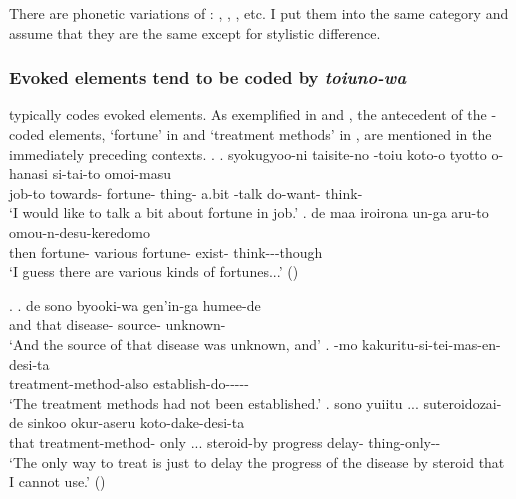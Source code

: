 There are phonetic variations of :
, , , etc.
I put them into the same category  and assume that they are the same
except for stylistic difference.


\subsubsection{Evoked elements tend to be coded by \textit{toiuno-wa}}

 typically codes evoked elements.
As exemplified in \Next and \NNext,
the antecedent of the -coded elements,
 `fortune' in \Next and  `treatment methods' in \NNext,
are mentioned in the immediately preceding contexts.
%
\ex.
 \ag. syokugyoo-ni taisite-no -toiu koto-o tyotto o-hanasi si-tai-to omoi-masu \\
		job-to towards- fortune- thing- a.bit -talk do-want- think- \\
		`I would like to talk a bit about fortune in job.'
 \bg. de  maa iroirona un-ga aru-to omou-n-desu-keredomo \\
 	then fortune-  various fortune- exist- think---though \\
	`I guess there are various kinds of fortunes...'
	\hfill{()}

\ex. \ag. de sono byooki-wa gen'in-ga humee-de \\
	and that disease- source- unknown- \\
	`And the source of that disease was unknown, and'
	\bg. -mo kakuritu-si-tei-mas-en-desi-ta \\
		treatment-method-also establish-do----- \\
		`The treatment methods had not been established.'
	\bg. sono  yuiitu ... suteroidozai-de sinkoo okur-aseru koto-dake-desi-ta \\
		that treatment-method- only ... steroid-by progress delay- thing-only-- \\
		`The only way to treat is just to delay the progress of the disease by steroid that I cannot use.' \hfill{()}

